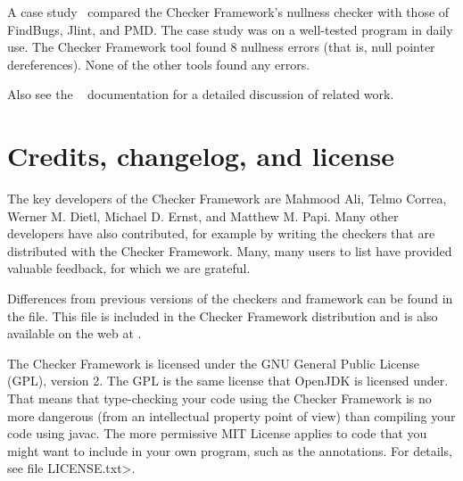 A case study~\cite[\S6]{PapiACPE2008} compared the Checker Framework's nullness
checker with those of FindBugs, Jlint, and PMD\@.  The case study was on a
well-tested program in daily use.  The Checker Framework tool found 8
nullness errors (that is, null pointer dereferences).  None of the other
tools found any errors.

Also see the
~\cite{JSR308-2008-09-12}
documentation for a detailed discussion of related work.



\section{Credits, changelog, and license\label{credits}}

The key developers of the Checker Framework are Mahmood Ali, Telmo Correa,
Werner M. Dietl, Michael D. Ernst, and Matthew M. Papi.
Many other developers have also contributed, for example by writing
the checkers that are distributed with the Checker Framework.
Many, many users to list have provided valuable feedback, for which we are
grateful.


Differences from previous versions of the checkers and framework can be found
in the  file.  This file is included in the
Checker Framework distribution and is also available on the web at
.

The Checker Framework is licensed under the GNU General Public License
(GPL), version 2.  The GPL is the same license that OpenJDK is licensed
under.  That means that type-checking your code using the Checker Framework
is no more dangerous (from an intellectual property point of view) than
compiling your code using javac.  The more permissive MIT License applies
to code that you might want to include in your own
program, such as the annotations.  For details, see file \<LICENSE.txt>.



